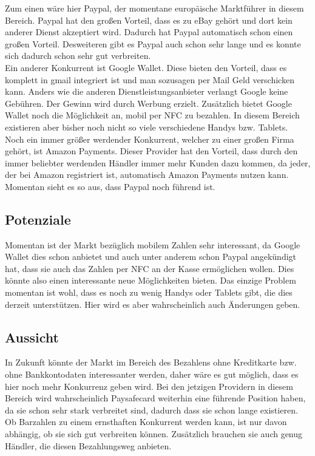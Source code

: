 Zum einen wäre hier Paypal, der momentane europäische Marktführer in diesem Bereich. Paypal hat den großen Vorteil, dass es zu eBay gehört und dort kein anderer Dienst akzeptiert wird. Dadurch hat Paypal automatisch schon einen großen Vorteil. Desweiteren gibt es Paypal auch schon sehr lange und es konnte sich dadurch schon sehr gut verbreiten.\\

Ein anderer Konkurrent ist Google Wallet. Diese bieten den Vorteil, dass es komplett in gmail integriert ist und man sozusagen per Mail Geld verschicken kann. Anders wie die anderen Dienstleistungsanbieter verlangt Google keine Gebühren. Der Gewinn wird durch Werbung erzielt. Zusätzlich bietet Google Wallet noch die Möglichkeit an, mobil per NFC zu bezahlen. In diesem Bereich existieren aber bisher noch nicht so viele verschiedene Handys bzw. Tablets.\\

Noch ein immer größer werdender Konkurrent, welcher zu einer großen Firma gehört, ist Amazon Payments. Dieser Provider hat den Vorteil, dass durch den immer beliebter werdenden Händler immer mehr Kunden dazu kommen, da jeder, der bei Amazon registriert ist, automatisch Amazon Payments nutzen kann.\\

Momentan sieht es so aus, dass Paypal noch führend ist.

\subsection{Potenziale}
Momentan ist der Markt bezüglich mobilem Zahlen sehr interessant, da Google Wallet dies schon anbietet und auch unter anderem schon Paypal angekündigt hat, dass sie auch das Zahlen per NFC an der Kasse ermöglichen wollen. Dies könnte also einen interessante neue Möglichkeiten bieten. Das einzige Problem momentan ist wohl, dass es noch zu wenig Handys oder Tablets gibt, die dies derzeit unterstützen. Hier wird es aber wahrscheinlich auch Änderungen geben.


\subsection{Aussicht}
In Zukunft könnte der Markt im Bereich des Bezahlens ohne Kreditkarte bzw. ohne Bankkontodaten interessanter werden, daher wäre es gut möglich, dass es hier noch mehr Konkurrenz geben wird. Bei den jetzigen Providern in diesem Bereich wird wahrscheinlich Paysafecard weiterhin eine führende Position haben, da sie schon sehr stark verbreitet sind, dadurch dass sie schon lange existieren. Ob Barzahlen zu einem ernsthaften Konkurrent werden kann, ist nur davon abhängig, ob sie sich gut verbreiten können. Zusätzlich brauchen sie auch genug Händler, die diesen Bezahlungsweg anbieten.\\

